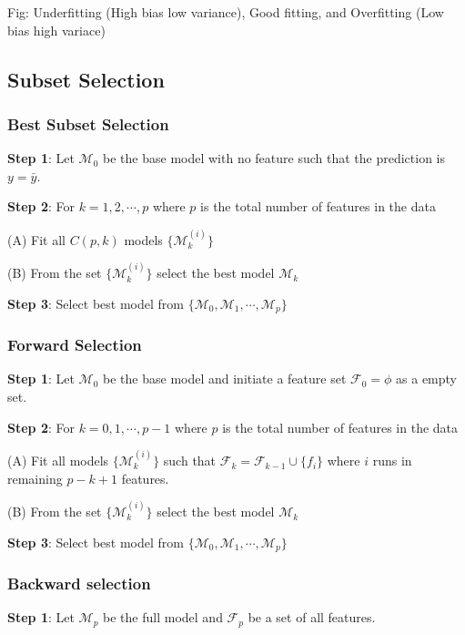 \documentclass[11pt]{article}
\theoremstyle{definition}
\begin{document}
Fig: Underfitting (High bias low variance), Good fitting, and Overfitting (Low bias high variace)



\subsection{Subset Selection} 

\subsubsection{Best Subset Selection}

{\bf{Step 1}}: Let $\mathcal{M}_0$ be the base model with no feature such that the prediction is $y = \bar{y}$.

{\bf{Step 2}}: For $k = 1, 2, \cdots, p$ where $p$ is the total number of features in the data

\quad (A) Fit all $C(p, k)$ models $\{ \mathcal{M}_k^{(i)} \}$ 

\quad (B) From the set $\{ \mathcal{M}_k^{(i)} \}$ select the best model $\mathcal{M}_k$

{\bf{Step 3}}: Select best model from $\{ \mathcal{M}_0, \mathcal{M}_1, \cdots, \mathcal{M}_p \}$


\subsubsection{Forward Selection} 

{\bf{Step 1}}: Let $\mathcal{M}_0$ be the base model and initiate a feature set $\mathcal{F}_0 = \phi$ as a empty set.

{\bf{Step 2}}: For $k = 0, 1, \cdots, p-1$ where $p$ is the total number of features in the data

\quad (A) Fit all models $\{ \mathcal{M}_k^{(i)} \}$  such that $\mathcal{F}_k = \mathcal{F}_{k-1} \cup \{f_i \}$ where $i$ runs in remaining $p-k+1$ features.

\quad (B) From the set $\{ \mathcal{M}_k^{(i)} \}$ select the best model $\mathcal{M}_k$

{\bf{Step 3}}: Select best model from $\{ \mathcal{M}_0, \mathcal{M}_1, \cdots, \mathcal{M}_p \}$


\subsubsection{Backward selection }

{\bf{Step 1}}: Let $\mathcal{M}_p$ be the full model and $\mathcal{F}_p$ be a set of all features.
\end{document}
